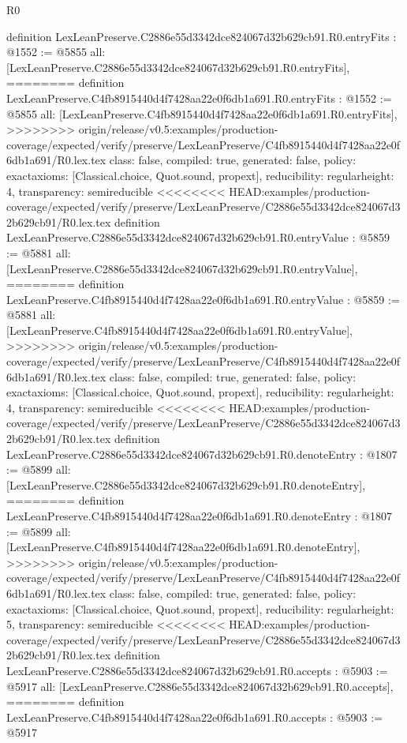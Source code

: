 \begin{lexlean}{R0}
\begin{coremodule}
{{{{{{{{{{{{{{{{{{{{{{{{{{{{{{{{{{{{{{{{{{{{{{{{{{{{{{{{{{{{{{{{{{{{{{{{{{{{{{{{{{{{{{{{{{{{{{{{{{definition LexLeanPreserve.C2886e55d3342dce824067d32b629cb91.R0.entryFits : @1552 := @5855 {
  all: [LexLeanPreserve.C2886e55d3342dce824067d32b629cb91.R0.entryFits],
========
definition LexLeanPreserve.C4fb8915440d4f7428aa22e0f6db1a691.R0.entryFits : @1552 := @5855 {
  all: [LexLeanPreserve.C4fb8915440d4f7428aa22e0f6db1a691.R0.entryFits],
>>>>>>>> origin/release/v0.5:examples/production-coverage/expected/verify/preserve/LexLeanPreserve/C4fb8915440d4f7428aa22e0f6db1a691/R0.lex.tex
  class: false,
  compiled: true,
  generated: false,
  policy: exact{axioms: [Classical.choice, Quot.sound, propext]},
  reducibility: regular{height: 4},
  transparency: semireducible
}
<<<<<<<< HEAD:examples/production-coverage/expected/verify/preserve/LexLeanPreserve/C2886e55d3342dce824067d32b629cb91/R0.lex.tex
definition LexLeanPreserve.C2886e55d3342dce824067d32b629cb91.R0.entryValue : @5859 := @5881 {
  all: [LexLeanPreserve.C2886e55d3342dce824067d32b629cb91.R0.entryValue],
========
definition LexLeanPreserve.C4fb8915440d4f7428aa22e0f6db1a691.R0.entryValue : @5859 := @5881 {
  all: [LexLeanPreserve.C4fb8915440d4f7428aa22e0f6db1a691.R0.entryValue],
>>>>>>>> origin/release/v0.5:examples/production-coverage/expected/verify/preserve/LexLeanPreserve/C4fb8915440d4f7428aa22e0f6db1a691/R0.lex.tex
  class: false,
  compiled: true,
  generated: false,
  policy: exact{axioms: [Classical.choice, Quot.sound, propext]},
  reducibility: regular{height: 4},
  transparency: semireducible
}
<<<<<<<< HEAD:examples/production-coverage/expected/verify/preserve/LexLeanPreserve/C2886e55d3342dce824067d32b629cb91/R0.lex.tex
definition LexLeanPreserve.C2886e55d3342dce824067d32b629cb91.R0.denoteEntry : @1807 := @5899 {
  all: [LexLeanPreserve.C2886e55d3342dce824067d32b629cb91.R0.denoteEntry],
========
definition LexLeanPreserve.C4fb8915440d4f7428aa22e0f6db1a691.R0.denoteEntry : @1807 := @5899 {
  all: [LexLeanPreserve.C4fb8915440d4f7428aa22e0f6db1a691.R0.denoteEntry],
>>>>>>>> origin/release/v0.5:examples/production-coverage/expected/verify/preserve/LexLeanPreserve/C4fb8915440d4f7428aa22e0f6db1a691/R0.lex.tex
  class: false,
  compiled: true,
  generated: false,
  policy: exact{axioms: [Classical.choice, Quot.sound, propext]},
  reducibility: regular{height: 5},
  transparency: semireducible
}
<<<<<<<< HEAD:examples/production-coverage/expected/verify/preserve/LexLeanPreserve/C2886e55d3342dce824067d32b629cb91/R0.lex.tex
definition LexLeanPreserve.C2886e55d3342dce824067d32b629cb91.R0.accepts : @5903 := @5917 {
  all: [LexLeanPreserve.C2886e55d3342dce824067d32b629cb91.R0.accepts],
========
definition LexLeanPreserve.C4fb8915440d4f7428aa22e0f6db1a691.R0.accepts : @5903 := @5917 {
}}}}}}}}}}}}}}}}}}}}}}}}}}}}}}}}}}}}}}}}}}}}}}}}}}}}}}}}}}}}}}}}}}}}}}}}}}}}}}}}}}}}}}}}}}}}}}}}}}}}}}}
\end{coremodule}
\end{lexlean}

